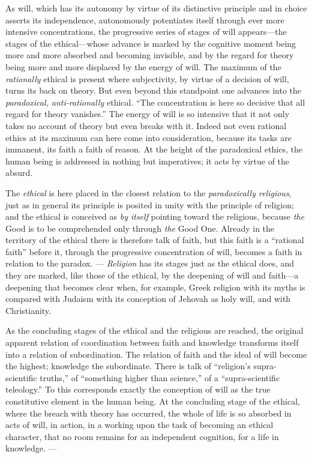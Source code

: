 \documentclass[12pt,a4paper]{book}
\begin{document}
As will, which has its autonomy by virtue of its distinctive principle
and in choice asserts its independence, autonomously potentiates itself
through ever more intensive concentrations, the progressive series of
stages of will appears---the stages of the ethical---whose advance is
marked by the cognitive moment being more and more absorbed and becoming
invisible, and by the regard for theory being more and more displaced by
the energy of will. The maximum of the \emph{rationally} ethical is present
where subjectivity, by virtue of a decision of will, turns its back on
theory. But even beyond this standpoint one advances into the
\emph{paradoxical, anti-rationally} ethical. ``The concentration is here so
decisive that all regard for theory vanishes.'' The energy of will is so
intensive that it not only takes no account of theory but even breaks
with it. Indeed not even rational ethics at its maximum can here come
into consideration, because its tasks are immanent, its faith a faith of
reason. At the height of the paradoxical ethics, the human being is
addressed in nothing but imperatives; it acts by virtue of the absurd.

The \emph{ethical} is here placed in the closest relation to the \emph{paradoxically
religious}, just as in general its principle is posited in unity with the
principle of religion; and the ethical is conceived as \emph{by itself}
pointing toward the religious, because \emph{the} Good is to be comprehended
only through \emph{the} Good One. Already in the territory of the ethical there
is therefore talk of faith, but this faith is a ``rational faith''
before it, through the progressive concentration of will, becomes a
faith in relation to the paradox. --- \emph{Religion} has its stages just as the
ethical does, and they are marked, like those of the ethical, by the
deepening of will and faith---a deepening that becomes clear when, for
example, Greek religion with its myths is compared with Judaism with its
conception of Jehovah as holy will, and with Christianity.

As the concluding stages of the ethical and the religious are reached,
the original apparent relation of coordination between faith and
knowledge transforms itself into a relation of subordination. The
relation of faith and the ideal of will become the highest; knowledge
the subordinate. There is talk of ``religion's supra-scientific
truths,'' of ``something higher than science,'' of a ``supra-scientific
teleology.'' To this corresponds exactly the conception of will as the
true constitutive element in the human being. At the concluding stage of
the ethical, where the breach with theory has occurred, the whole of
life is so absorbed in acts of will, in action, in a working upon the
task of becoming an ethical character, that no room remains for an
independent cognition, for a life in knowledge. ---
\end{document}
